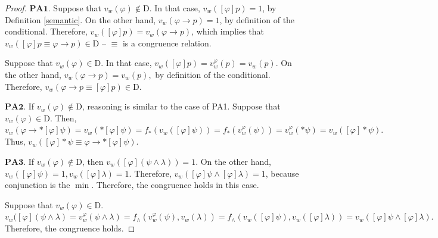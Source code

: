 \documentclass[paper=a4, fontsize=11pt]{scrartcl} %
\numberwithin{equation}{section} %
\numberwithin{figure}{section} %
\numberwithin{table}{section} %
\begin{document}
\begin{proof}
    $\bm{PA1}$. Suppose that $v_w(\varphi) \notin \mathrm{D}.$ In that case, $v_w([\varphi]p) = 1$, by Definition \ref{semantic}. On the other hand, $v_w(\varphi \rightarrow p) = 1$, by definition of the conditional. Therefore, $v_w([\varphi]p) = v_w(\varphi \rightarrow p)$, which implies that $v_w([\varphi]p \equiv \varphi \rightarrow p) \in \mathrm{D}$ -- $\equiv$ is a congruence relation. 

    Suppose that $v_w(\varphi) \in \mathrm{D}.$ In that case, $v_w([\varphi]p) = v_w^\varphi(p) = v_w(p).$ On the other hand, $v_w(\varphi \rightarrow p) = v_w(p),$ by definition of the conditional. Therefore, $v_w(\varphi \rightarrow p \equiv [\varphi]p) \in \mathrm{D}$.

    $\bm{PA2}$. If $v_w(\varphi) \notin \mathrm{D}$, reasoning is similar to the case of PA1. Suppose that $v_w(\varphi) \in \mathrm{D}$. Then, $v_w(\varphi \rightarrow *[\varphi]\psi) = v_w(*[\varphi]\psi) = f_*(v_w([\varphi]\psi)) = f_*(v_w^\varphi(\psi)) = v_w^\varphi(*\psi) = v_w([\varphi]*\psi).$ Thus, $v_w([\varphi]*\psi \equiv \varphi \rightarrow *[\varphi]\psi)$.

    $\bm{PA3}$. If $v_w(\varphi) \notin \mathrm{D}$, then $v_w([\varphi](\psi \land \lambda)) = 1$. On the other hand, $v_w([\varphi]\psi) = 1, v_w([\varphi]\lambda) = 1$. Therefore, $v_w([\varphi]\psi \land [\varphi]\lambda) = 1$, because conjunction is the $\min$. Therefore, the congruence holds in this case.

    Suppose that $v_w(\varphi) \in \mathrm{D}$. $v_w([\varphi](\psi \land \lambda) = v_w^\varphi(\psi \land \lambda) = f_\land(v_w^\varphi(\psi), v_w(\lambda)) = f_\land(v_w([\varphi]\psi), v_w([\varphi]\lambda)) = v_w([\varphi]\psi \land [\varphi]\lambda).$ Therefore, the congruence holds. 


\end{proof}
\end{document}

